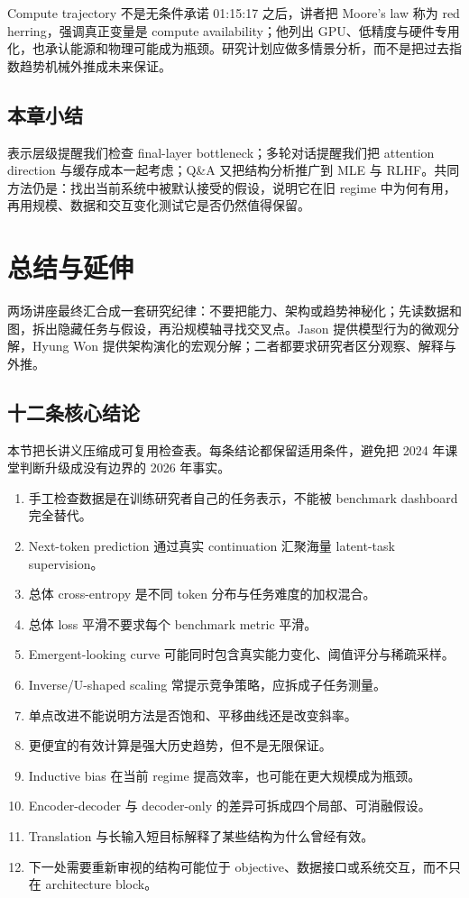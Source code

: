 \documentclass[a4paper]{article}
\begin{document}
\begin{warningbox}{Compute trajectory 不是无条件承诺}
01:15:17 之后，讲者把 Moore's law 称为 red herring，强调真正变量是 compute availability；他列出 GPU、低精度与硬件专用化，也承认能源和物理可能成为瓶颈。研究计划应做多情景分析，而不是把过去指数趋势机械外推成未来保证。
\end{warningbox}

\subsection{本章小结}

表示层级提醒我们检查 final-layer bottleneck；多轮对话提醒我们把 attention direction 与缓存成本一起考虑；Q\&A 又把结构分析推广到 MLE 与 RLHF。共同方法仍是：找出当前系统中被默认接受的假设，说明它在旧 regime 中为何有用，再用规模、数据和交互变化测试它是否仍然值得保留。

\section{总结与延伸}

两场讲座最终汇合成一套研究纪律：不要把能力、架构或趋势神秘化；先读数据和图，拆出隐藏任务与假设，再沿规模轴寻找交叉点。Jason 提供模型行为的微观分解，Hyung Won 提供架构演化的宏观分解；二者都要求研究者区分观察、解释与外推。

\subsection{十二条核心结论}

本节把长讲义压缩成可复用检查表。每条结论都保留适用条件，避免把 2024 年课堂判断升级成没有边界的 2026 年事实。

\begin{enumerate}
  \item 手工检查数据是在训练研究者自己的任务表示，不能被 benchmark dashboard 完全替代。
  \item Next-token prediction 通过真实 continuation 汇聚海量 latent-task supervision。
  \item 总体 cross-entropy 是不同 token 分布与任务难度的加权混合。
  \item 总体 loss 平滑不要求每个 benchmark metric 平滑。
  \item Emergent-looking curve 可能同时包含真实能力变化、阈值评分与稀疏采样。
  \item Inverse/U-shaped scaling 常提示竞争策略，应拆成子任务测量。
  \item 单点改进不能说明方法是否饱和、平移曲线还是改变斜率。
  \item 更便宜的有效计算是强大历史趋势，但不是无限保证。
  \item Inductive bias 在当前 regime 提高效率，也可能在更大规模成为瓶颈。
  \item Encoder-decoder 与 decoder-only 的差异可拆成四个局部、可消融假设。
  \item Translation 与长输入短目标解释了某些结构为什么曾经有效。
  \item 下一处需要重新审视的结构可能位于 objective、数据接口或系统交互，而不只在 architecture block。
\end{enumerate}
\end{document}
